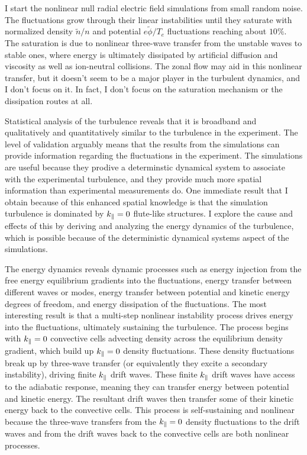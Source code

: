 I start the nonlinear null radial electric field simulations from small random noise. The fluctuations grow through their linear instabilities until they saturate with 
normalized density $\tilde{n}/n$ and potential $e \tilde{\phi}/T_e$ fluctuations reaching about $10 \%$. The saturation is due to nonlinear three-wave transfer from the unstable waves
to stable ones, where energy is ultimately dissipated by artificial diffusion and viscosity as well as ion-neutral collisions. 
The zonal flow may aid in this nonlinear transfer, but it doesn't seem to be a major player in the turbulent
dynamics, and I don't focus on it. In fact, I don't focus on the saturation mechanism or the dissipation routes at all.

Statistical analysis of the turbulence reveals that it is broadband and qualitatively and quantitatively similar to the turbulence in the experiment. The level of validation arguably means that
the results from the simulations can provide information regarding the fluctuations in the experiment. The simulations are useful because they prodive a determinstic dynamical system to
associate with the experimental turbulence, and they provide much more spatial information than experimental measurements do. One immediate result that I obtain because of this enhanced spatial knowledge
is that the simulation turbulence is dominated by $k_\parallel = 0$ flute-like structures. I explore the cause and effects of this by deriving and analyzing the energy dynamics of the turbulence,
which is possible because of the deterministic dynamical systems aspect of the simulations.

The energy dynamics reveals dynamic processes such as energy injection from the free energy equilibrium gradients into the fluctuations, energy transfer between different waves or modes,
energy transfer between potential and kinetic energy degrees of freedom, and energy dissipation of the fluctuations. The most interesting result is that a multi-step nonlinear instability
process drives energy into the fluctuations, ultimately sustaining the turbulence. The process begins with $k_\parallel = 0$ convective cells advecting density across the equilibrium density gradient,
which build up $k_\parallel = 0$ density fluctuations. These density fluctuations break up by three-wave transfer (or equivalently they excite a secondary instability), driving finite $k_\parallel$
drift waves. These finite $k_\parallel$ drift waves have access to the adiabatic response, meaning they can transfer energy between potential and kinetic energy. The resultant drift waves then
transfer some of their kinetic energy back to the convective cells. This process is self-sustaining and nonlinear because the three-wave transfers from the $k_\parallel = 0$ density fluctuations
to the drift waves and from the drift waves back to the convective cells are both nonlinear processes. 

